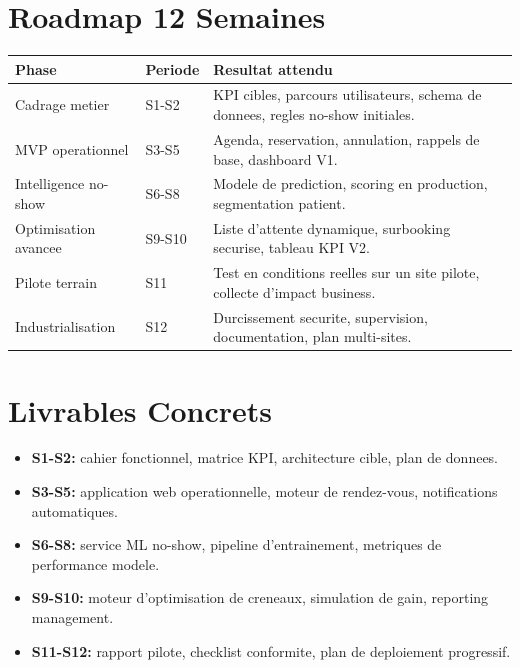 \documentclass[11pt,a4paper]{article}
\begin{document}
\section*{Roadmap 12 Semaines}
\begin{center}
\begin{tabular}{|p{2.2cm}|p{2.4cm}|p{8.8cm}|}
\hline
\textbf{Phase} & \textbf{Periode} & \textbf{Resultat attendu} \\
\hline
Cadrage metier & S1-S2 & KPI cibles, parcours utilisateurs, schema de donnees, regles no-show initiales. \\
\hline
MVP operationnel & S3-S5 & Agenda, reservation, annulation, rappels de base, dashboard V1. \\
\hline
Intelligence no-show & S6-S8 & Modele de prediction, scoring en production, segmentation patient. \\
\hline
Optimisation avancee & S9-S10 & Liste d'attente dynamique, surbooking securise, tableau KPI V2. \\
\hline
Pilote terrain & S11 & Test en conditions reelles sur un site pilote, collecte d'impact business. \\
\hline
Industrialisation & S12 & Durcissement securite, supervision, documentation, plan multi-sites. \\
\hline
\end{tabular}
\end{center}

\section*{Livrables Concrets}
\begin{itemize}[leftmargin=*]
  \item \textbf{S1-S2:} cahier fonctionnel, matrice KPI, architecture cible, plan de donnees.
  \item \textbf{S3-S5:} application web operationnelle, moteur de rendez-vous, notifications automatiques.
  \item \textbf{S6-S8:} service ML no-show, pipeline d'entrainement, metriques de performance modele.
  \item \textbf{S9-S10:} moteur d'optimisation de creneaux, simulation de gain, reporting management.
  \item \textbf{S11-S12:} rapport pilote, checklist conformite, plan de deploiement progressif.
\end{itemize}
\end{document}
